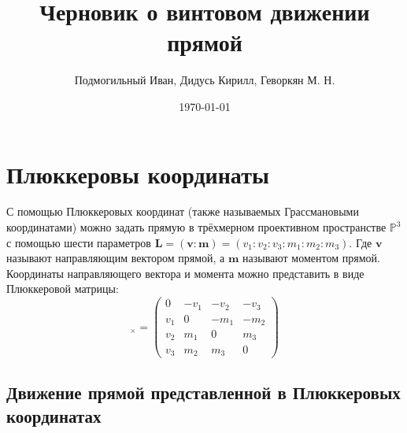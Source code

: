 

\author{Подмогильный Иван, Дидусь Кирилл, Геворкян М. Н.}
\date{\today}
\title{Черновик о винтовом движении прямой}


  
  \maketitle


  


  \section{Плюккеровы координаты}

  С помощью Плюккеровых координат (также называемых Грассмановыми координатами) \autocite[Гл. 7]{hodgeMethodsAlgebraicGeometry1994}
  можно задать прямую в трёхмерном проективном пространстве $\mathbb{P}^3$ с помощью шести параметров $\mathbf{L}=(\mathbf{v}:\mathbf{m})=(v_1:v_2:v_3:m_1:m_2:m_3)$.
  Где $\mathbf{v}$ называют направляющим вектором прямой, а $\mathbf{m}$ называют моментом прямой. Координаты направляющего вектора и момента можно представить в виде
  Плюккеровой матрицы: 
  \begin{equation*}
    [\mathbf{L}]_\times = 
    \begin{pmatrix}
      0 & -v_1 & -v_2 & -v_3 \\
      v_1 & 0 & -m_1 & -m_2 \\
      v_2 & m_1 & 0 & m_3 \\
      v_3 & m_2 & m_3 & 0
    \end{pmatrix}
  \end{equation*}
  
  \subsection{Движение прямой представленной в Плюккеровых координатах}

